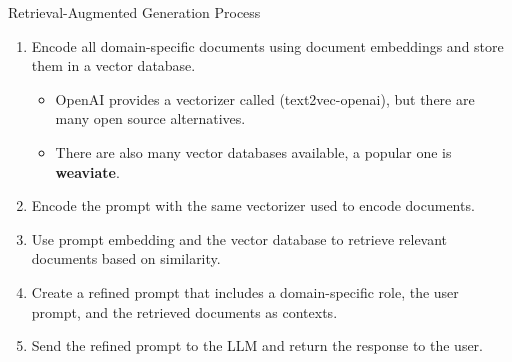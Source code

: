 \documentclass[handout]{beamer}
\begin{document}
\begin{frame}{Retrieval-Augmented Generation Process}
\begin{scriptsize}
\begin{enumerate}
 \item Encode all domain-specific documents using document embeddings and store them in a vector database.  
  \begin{itemize}\scriptsize
    \item OpenAI provides a vectorizer called (text2vec-openai), but there are many open source alternatives.
 \item There are also many vector databases available, a popular one is \textbf{weaviate}.
  \end{itemize}
 \item Encode the prompt with the same vectorizer used to encode documents.
 \item Use prompt embedding and the vector database to retrieve relevant documents based on similarity.
 \item Create a refined prompt that includes a domain-specific role, the user prompt, and the retrieved documents as contexts.
 \item Send the refined prompt to the LLM and return the response to the user.
\end{enumerate}

\end{scriptsize}



\end{frame}

 

\end{document}
